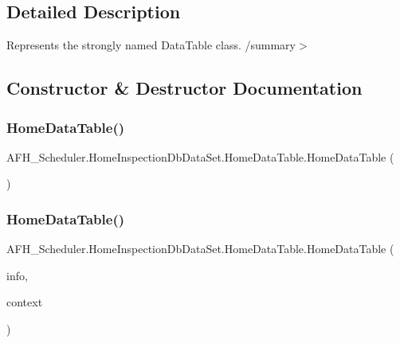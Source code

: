 \subsection{Detailed Description}
Represents the strongly named Data\+Table class. /summary$>$ 

\subsection{Constructor \& Destructor Documentation}
\mbox{\label{class_a_f_h___scheduler_1_1_home_inspection_db_data_set_1_1_home_data_table_ad145a4b84c44522d4005c91d302a6ebd}} 
\subsubsection{HomeDataTable()\hspace{0.1cm}{\footnotesize\ttfamily [1/2]}}
{\footnotesize\ttfamily A\+F\+H\+\_\+\+Scheduler.\+Home\+Inspection\+Db\+Data\+Set.\+Home\+Data\+Table.\+Home\+Data\+Table (\begin{DoxyParamCaption}{ }\end{DoxyParamCaption})}

\mbox{\label{class_a_f_h___scheduler_1_1_home_inspection_db_data_set_1_1_home_data_table_aed19881a736176056b84a7afb3818502}} 
\subsubsection{HomeDataTable()\hspace{0.1cm}{\footnotesize\ttfamily [2/2]}}
{\footnotesize\ttfamily A\+F\+H\+\_\+\+Scheduler.\+Home\+Inspection\+Db\+Data\+Set.\+Home\+Data\+Table.\+Home\+Data\+Table (\begin{DoxyParamCaption}\item[{global\+::\+System.\+Runtime.\+Serialization.\+Serialization\+Info}]{info,  }\item[{global\+::\+System.\+Runtime.\+Serialization.\+Streaming\+Context}]{context }\end{DoxyParamCaption})\hspace{0.3cm}{\ttfamily [protected]}}



